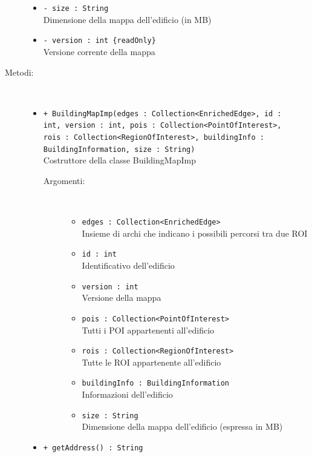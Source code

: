 \documentclass[../DefinizioneDiProdotto.tex]{subfiles}
\begin{document}
\begin{description}
\begin{itemize}
		\item \texttt{- size : String}\\
		Dimensione della mappa dell'edificio (in MB)
		
		\item \texttt{- version : int \{readOnly\}}\\
		Versione corrente della mappa
		
	\end{itemize}
	\item[Metodi:] \
	\begin{itemize}
		\item \texttt{+ BuildingMapImp(edges : Collection<EnrichedEdge>, id : \\ int, version : int, pois : Collection<PointOfInterest>, \\ rois : Collection<RegionOfInterest>, buildingInfo : \\BuildingInformation, size : String)}\\
		Costruttore della classe BuildingMapImp
		\begin{description}
			\item[Argomenti:] \
			\begin{itemize}
				\item \texttt{edges : Collection<EnrichedEdge>}\\
				Insieme di archi che indicano i possibili percorsi tra due ROI\item \texttt{id : int}\\
				Identificativo dell'edificio\item \texttt{version : int}\\
				Versione della mappa\item \texttt{pois : Collection<PointOfInterest>}\\
				Tutti i POI appartenenti all'edificio\item \texttt{rois : Collection<RegionOfInterest>}\\
				Tutte le ROI appartenente all'edificio\item \texttt{buildingInfo : BuildingInformation}\\
				Informazioni dell'edificio\item \texttt{size : String}\\
				Dimensione della mappa dell'edificio (espressa in MB)\end{itemize}
		\end{description}
		\item \texttt{+ getAddress() : String}\\

\end{itemize}
\end{description}
\end{document}
